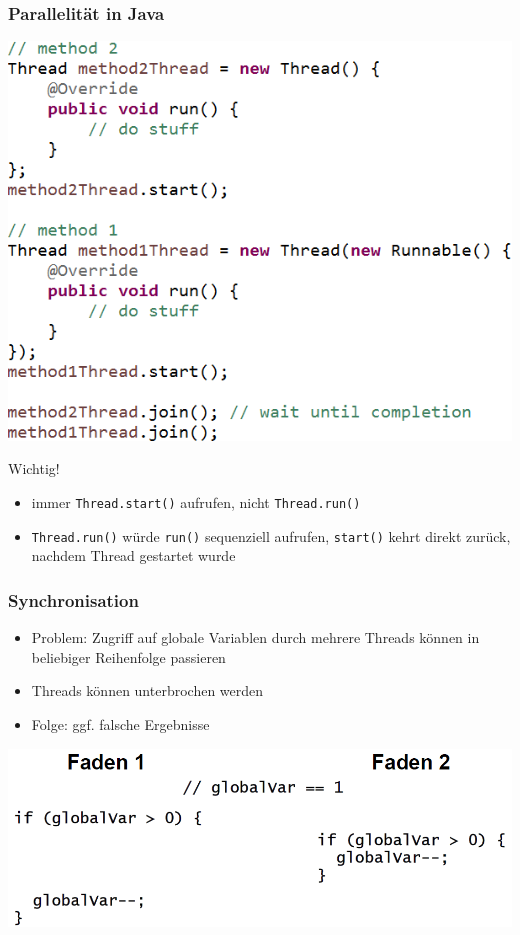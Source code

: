 \documentclass[18pt]{beamer}
\begin{document}
	\begin{frame}
		\frametitle{Parallelität in Java}
		\centering
		\includegraphics[scale=0.43]{./pics/tut5/crea-thr-java.png}
		\pause
		\begin{alertblock}{Wichtig!}
			\begin{itemize}
				\item immer \texttt{Thread.start()} aufrufen, nicht \texttt{Thread.run()} \pause
				\item \texttt{Thread.run()} würde \texttt{run()} sequenziell aufrufen, \texttt{start()} kehrt direkt zurück, nachdem Thread gestartet wurde
			\end{itemize}
		\end{alertblock}
	\end{frame}

	\begin{frame}
		\frametitle{Synchronisation}
		\begin{itemize}
			\item Problem: Zugriff auf globale Variablen durch mehrere Threads können in beliebiger Reihenfolge passieren
			\item Threads können unterbrochen werden
			\item Folge: ggf. falsche Ergebnisse
		\end{itemize}
		\includegraphics[scale=0.43]{./pics/tut5/par-pro.png}
	\end{frame}
\end{document}
